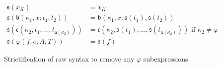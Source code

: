 
\begin{figure}
    \centering
    \begin{align*}
        \mathfrak{s}(x_K) &= x_K \\
        \mathfrak{s}(\mathfrak{b}(\kappa_1, x : t_1, t_2)) &= \mathfrak{b}(\kappa_1, x : \mathfrak{s}(t_1), \mathfrak{s}(t_2)) \\
        \mathfrak{s}(\mathfrak{c}(\kappa_2, t_1, \ldots, t_{\mathfrak{a}(\kappa_2)})) &= \mathfrak{c}(\kappa_2, \mathfrak{s}(t_1), \ldots, \mathfrak{s}(t_{\mathfrak{a}(\kappa_2)})) \text{ if }\kappa_2 \neq \varphi \\
        \mathfrak{s}(\varphi(f, e; A, T)) &= \mathfrak{s}(f)
    \end{align*}
    \caption{Strictification of raw syntax to remove any $\varphi$ subexpressions.}
    \label{fig:strict}
\end{figure}

